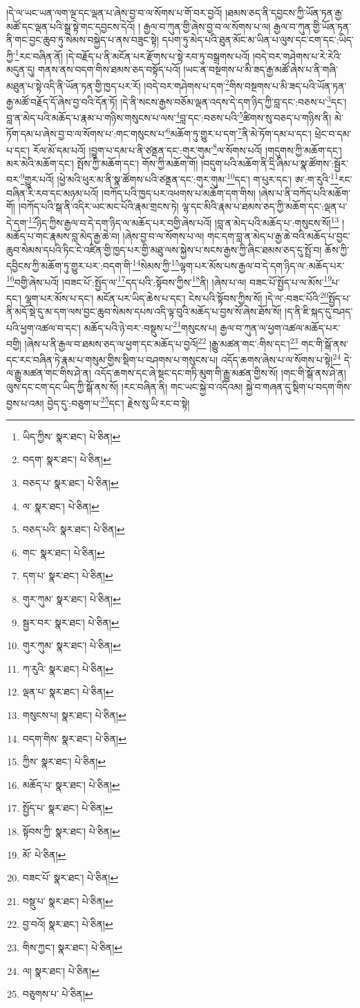 །དེ་ལ་ཡང་ཡན་ལག་ལྔ་དང་ལྡན་པ་ཞེས་བྱ་བ་ལ་སོགས་པ་གོ་བར་བྱའོ། །ཐམས་ཅད་ནི་དབྱངས་ཀྱི་ཡོན་ཏན་རྒྱ་མཚོ་དང་ལྡན་པའི་སྒྲ་སྟེ་གང་དབྱངས་དེའོ། །
རྒྱལ་བ་ཀུན་གྱི་ཞེས་བྱ་བ་ལ་སོགས་པ་ལ། རྒྱལ་བ་ཀུན་གྱི་ཡོན་ཏན་ནི་གང་བྱང་ཆུབ་ཏུ་སེམས་བསྐྱེད་པ་ནས་བཟུང་སྟེ། དཔག་ཏུ་མེད་པའི་ཐུན་མོང་མ་ཡིན་པ་ལུས་དང་ངག་དང་:ཡིད་ཀྱི་\footnote{ཡིད་ཀྱིས་  སྣར་ཐང་།  པེ་ཅིན། }རང་བཞིན་ནོ། །དེ་བརྗོད་པ་ནི་མངོན་པར་རྫོགས་པ་སྟེ་རབ་ཏུ་བསྒྲགས་པའོ། །བདེ་བར་གཤེགས་པ་རེ་རེའི་མདུན་དུ། གནས་ནས་བདག་གིས་ཐམས་ཅད་བསྟོད་པའོ། །ཡང་ན་བསྔགས་པ་མི་ཟད་རྒྱ་མཚོ་ཞེས་པ་ནི་གཞི་མཐུན་པ་སྟེ་འདི་ནི་ཡོན་ཏན་གྱི་ཁྱད་པར་རོ། །བདེ་བར་གཤེགས་པ་དག་\footnote{བདག་  སྣར་ཐང་།  པེ་ཅིན། }གིས་བསྔགས་པ་མི་ཟད་པའི་ཡོན་ཏན་རྒྱ་མཚོ་བརྗོད་དོ་ཞེས་བྱ་བའི་དོན་ཏོ། །དེ་ནི་སངས་རྒྱས་བཅོམ་ལྡན་འདས་དེ་དག་ཉིད་ཀྱི་བླ་དང་:བཅས་པ་\footnote{བཅད་པ་  སྣར་ཐང་།  པེ་ཅིན། }དང་། བླ་ན་མེད་པའི་མཆོད་པ་རྣམ་པ་གཉིས་གསུངས་པ་ལས་\footnote{ལ་  སྣར་ཐང་།  པེ་ཅིན། }བླ་དང་:བཅས་པའི་\footnote{བཅད་པའི་  སྣར་ཐང་།  པེ་ཅིན། }ཚིགས་སུ་བཅད་པ་གཉིས་ནི། མེ་ཏོག་དམ་པ་ཞེས་བྱ་བ་ལ་སོགས་པ་:གང་གསུངས་པ་\footnote{གང་  སྣར་ཐང་།  པེ་ཅིན། }མཆོག་ཏུ་གྱུར་པ་དག་\footnote{དག་པ་  སྣར་ཐང་།  པེ་ཅིན། }ནི་མེ་ཏོག་དམ་པ་དང་། ཕྲེང་བ་དམ་པ་དང་། རོལ་མོ་དམ་པའོ། །བྱུག་པ་དམ་པ་ནི་ཙནྡན་དང་:གུར་གུམ་\footnote{གུར་ཀུམ་  སྣར་ཐང་།  པེ་ཅིན། }ལ་སོགས་པའོ། །གདུགས་ཀྱི་མཆོག་དང་། མར་མེའི་མཆོག་དང་། སྤོས་ཀྱི་མཆོག་དང་། གོས་ཀྱི་མཆོག་གོ། །བདུག་པའི་མཆོག་ནི་དྲི་ཞིམ་པ་སྣ་ཚོགས་:སྦྱོར་བར་\footnote{སྦྱར་བར་  སྣར་ཐང་།  པེ་ཅིན། }གྱུར་པའོ། །ཕྱེ་མའི་ཕུར་མ་ནི་སྣ་ཚོགས་པའི་ཙནྡན་དང་:གུར་གུམ་\footnote{གུར་ཀུམ་  སྣར་ཐང་།  པེ་ཅིན། }དང་། ག་པུར་དང་། ཨ་:ག་རུའི་\footnote{ཀ་རུའི་  སྣར་ཐང་།  པེ་ཅིན། }རང་བཞིན་རི་རབ་དང་མཉམ་པའོ། །བཀོད་པའི་ཁྱད་པར་འཕགས་པ་མཆོག་དག་གིས། །ཞེས་པ་ནི་བཀོད་པའི་མཆོག་གོ། །བཀོད་པའི་སྒ་ནི་འདིར་ཡང་མང་པོའི་རྣམ་གྲངས་ཏེ། ལྷ་དང་མིའི་རྣམ་པ་ཐམས་ཅད་ཀྱི་མཆོག་དང་:ལྡན་པ་དེ་དག་\footnote{ལྡན་པ་  སྣར་ཐང་།  པེ་ཅིན། }ཉིད་ཀྱིས་རྒྱལ་བ་དེ་དག་ཉིད་ལ་མཆོད་པར་བགྱི་ཞེས་པའོ། །བླ་ན་མེད་པའི་མཆོད་པ་:གསུངས་སོ།\footnote{གསུངས་པ།  སྣར་ཐང་།  པེ་ཅིན། } །མཆོད་པ་གང་རྣམས་བླ་མེད་རྒྱ་ཆེ་བ། །ཞེས་བྱ་བ་ལ་སོགས་པ་ལ། གང་དག་བླ་ན་མེད་པ་རྒྱ་ཆེ་བའི་མཆོད་པ་བྱང་ཆུབ་སེམས་དཔའི་ཏིང་ངེ་འཛིན་གྱི་ཁྱད་པར་གྱི་མཐུ་ལས་སྐྱེས་པ་སངས་རྒྱས་ཀྱི་ཞིང་ཐམས་ཅད་དུ་སྤྲོ་བ། ཆོས་ཀྱི་དབྱིངས་ཀྱི་མཆོག་ཏུ་གྱུར་པར་:བདག་གི་\footnote{བདག་གིས་  སྣར་ཐང་།  པེ་ཅིན། }སེམས་ཀྱི་\footnote{ཀྱིས་  སྣར་ཐང་།  པེ་ཅིན། }ལྷག་པར་མོས་པས་རྒྱལ་བ་དེ་དག་ཉིད་ལ་:མཆོད་པར་\footnote{མཆོད་པ་  སྣར་ཐང་།  པེ་ཅིན། }བགྱི་ཞེས་པའོ། །བཟང་པོ་:སྤྱོད་ལ་\footnote{སྤྱོད་པ་  སྣར་ཐང་།  པེ་ཅིན། }དད་པའི་:སྟོབས་ཀྱིས་\footnote{སྟོབས་ཀྱི་  སྣར་ཐང་།  པེ་ཅིན། }ནི། །ཞེས་པ་ལ། བཟང་པོ་སྤྱོད་པ་ལ་མོས་\footnote{མོ་  པེ་ཅིན། }པ་དང་། ལྷག་པར་མོས་པ་དང་། མངོན་པར་ཡིད་ཆེས་པ་དང་། ངེས་པའི་སྟོབས་ཀྱིས་སོ། །དེ་ལ་:བཟང་པོའི་\footnote{བཟང་པོ་  སྣར་ཐང་།  པེ་ཅིན། }སྤྱོད་པ་ནི་མདོ་སྡེ་དུ་མ་དག་ལས་བྱང་ཆུབ་སེམས་དཔས་འདི་ལྟ་བུའི་མཆོད་པ་བྱས་སོ་ཞེས་ཐོས་སོ། །ད་ནི་ཇི་སྐད་དུ་བཤད་པའི་ཕྱག་འཚལ་བ་དང་། མཆོད་པའི་ཉེ་བར་:བསྡུས་པ་\footnote{བསྡུ་པ་  སྣར་ཐང་།  པེ་ཅིན། }གསུངས་པ། རྒྱལ་བ་ཀུན་ལ་ཕྱག་འཚལ་མཆོད་པར་བགྱི། །ཞེས་པ་ནི་རྒྱལ་བ་ཐམས་ཅད་ལ་ཕྱག་དང་མཆོད་པ་བྱའོ།\footnote{བྱ་བའོ།  སྣར་ཐང་།  པེ་ཅིན། } །རྒྱུ་མཚན་གང་:གིས་དང་།\footnote{གིས་ཀྱང་།  སྣར་ཐང་།  པེ་ཅིན། } གང་གི་སྒོ་ནས་དང་རང་བཞིན་ཏེ་རྣམ་པ་གསུམ་གྱིས་སྡིག་པ་བཤགས་པ་གསུངས་པ། འདོད་ཆགས་ཞེས་པ་ལ་སོགས་པ་སྟེ།\footnote{ལ།  སྣར་ཐང་།  པེ་ཅིན། } དེ་ལ་རྒྱུ་མཚན་གང་གིས་ཤེ་ན། འདོད་ཆགས་དང་ཞེ་སྡང་དང་གཏི་མུག་གི་རྒྱུ་མཚན་གྱིས་སོ། །གང་གི་སྒོ་ནས་ཤེ་ན། ལུས་དང་ངག་དང་ཡིད་ཀྱི་སྒོ་ནས་སོ། །རང་བཞིན་ནི། གང་ཡང་སྐྱེ་བ་འདིའམ། སྐྱེ་བ་གཞན་དུ་སྡིག་པ་བདག་གིས་བྱས་པ་འམ། བྱེད་དུ་:བཅུག་པ་\footnote{བཅུགས་པ་  པེ་ཅིན། }དང་། རྗེས་སུ་ཡི་རང་བ་སྟེ། 